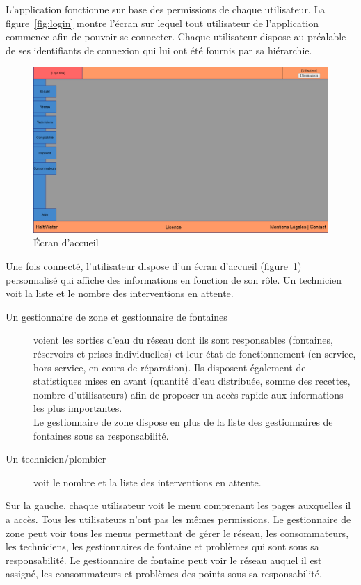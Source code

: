 \documentclass[a4paper, 11pt]{article}
\begin{document}
    L'application fonctionne sur base des permissions de chaque utilisateur. La figure~\ref{fig:login} montre l'écran sur lequel tout utilisateur de l'application commence afin de pouvoir se connecter. Chaque utilisateur dispose au préalable de ses identifiants de connexion qui lui ont été fournis par sa hiérarchie.

    \begin{figure}[H]
        \includegraphics[width=\textwidth]{Cahier_des_Charges/accueil} %
        \caption{\'Ecran d'accueil}
        \label{fig:dashboard}
    \end{figure}

    Une fois connecté, l'utilisateur dispose d'un écran d'accueil (figure~\ref{fig:dashboard}) personnalisé qui affiche des informations en fonction de son rôle. Un technicien voit la liste et le nombre des interventions en attente.
    \begin{description}
      \item[Un gestionnaire de zone et gestionnaire de fontaines] voient les sorties d'eau du réseau dont ils sont responsables (fontaines, réservoirs et prises individuelles) et leur état de fonctionnement (en service, hors service, en cours de réparation). Ils disposent également de statistiques mises en avant (quantité d'eau distribuée, somme des recettes, nombre d'utilisateurs) afin de proposer un accès rapide aux informations les plus importantes.\\
      Le gestionnaire de zone dispose en plus de la liste des gestionnaires de fontaines sous sa responsabilité.
      \item[Un technicien/plombier] voit le nombre et la liste des interventions en attente.
    \end{description}
    Sur la gauche, chaque utilisateur voit le menu comprenant les pages auxquelles il a accès. Tous les utilisateurs n'ont pas les mêmes permissions. Le gestionnaire de zone peut voir tous les menus permettant de gérer le réseau, les consommateurs, les techniciens, les gestionnaires de fontaine et problèmes qui sont sous sa responsabilité. Le gestionnaire de fontaine peut voir le réseau auquel il est assigné, les consommateurs et problèmes des points sous sa responsabilité.
\end{document}
